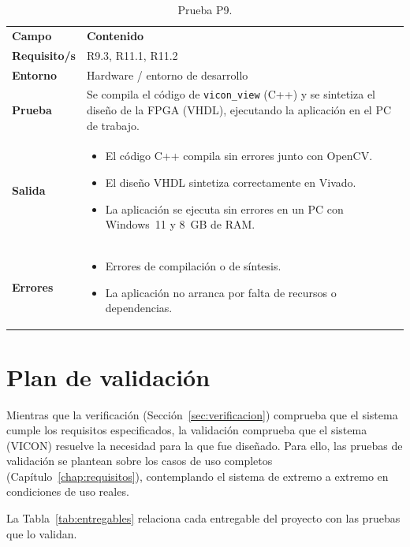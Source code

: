 \documentclass[../main.tex]{subfiles}
\begin{document}
\begin{table}[H]
\centering
\caption{Prueba P9.}
\label{tab:prueba_p9}
\begin{tabular}{>{\raggedright\arraybackslash}p{2.5cm}>{\raggedright\arraybackslash}p{11cm}}
\rowcolor[HTML]{156082}
{\color{white}\textbf{Campo}} & {\color{white}\textbf{Contenido}} \\
\rowcolor[HTML]{C0E6F5}
\textbf{Requisito/s} & R9.3, R11.1, R11.2 \\
\textbf{Entorno} & Hardware / entorno de desarrollo \\
\rowcolor[HTML]{C0E6F5}
\textbf{Prueba} & Se compila el código de \texttt{vicon\_view} (C++) y se sintetiza el diseño de la FPGA (VHDL), ejecutando la aplicación en el PC de trabajo. \\
\textbf{Salida} & \begin{itemize}\setlength{\itemsep}{0pt}
    \item El código C++ compila sin errores junto con OpenCV.
    \item El diseño VHDL sintetiza correctamente en Vivado.
    \item La aplicación se ejecuta sin errores en un PC con Windows~11 y 8~GB de RAM.
\end{itemize} \\
\rowcolor[HTML]{C0E6F5}
\textbf{Errores} & \begin{itemize}\setlength{\itemsep}{0pt}
    \item Errores de compilación o de síntesis.
    \item La aplicación no arranca por falta de recursos o dependencias.
\end{itemize} \\
\end{tabular}
\end{table}


\section{Plan de validación}
\label{sec:validacion}
Mientras que la verificación (Sección~\ref{sec:verificacion}) comprueba que el sistema cumple los requisitos especificados, la validación comprueba que el sistema (VICON) resuelve la necesidad para la que fue diseñado. Para ello, las pruebas de validación se plantean sobre los casos de uso completos (Capítulo~\ref{chap:requisitos}), contemplando el sistema de extremo a extremo en condiciones de uso reales.

La Tabla~\ref{tab:entregables} relaciona cada entregable del proyecto con las pruebas que lo validan.
\end{document}
